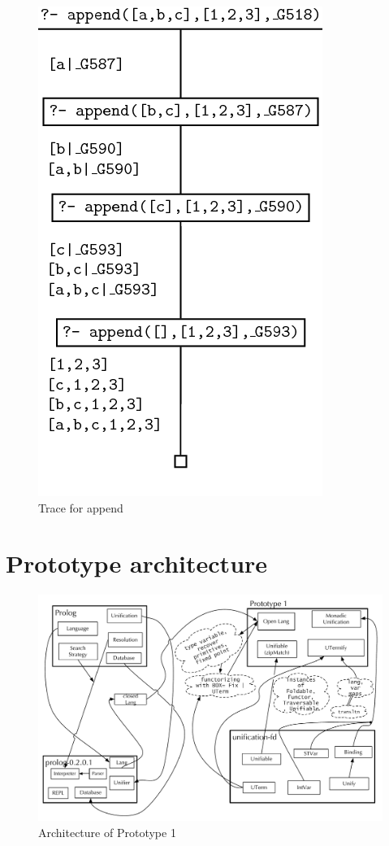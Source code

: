 \documentclass[thesis-solanki.tex]{subfiles}
\begin{document}
\begin{figure}[H]
\centering
\includegraphics[scale = 0.5]{PrologAppendWorking.png}
\caption{Trace for append \cite{webiste:learnprolognowappend}}
\label{fig:Trace for append}
\end{figure}

\section{Prototype architecture}

\begin{figure}[H]
  \includegraphics[width=1\textwidth]{Prototype-1.pdf}
  \caption{Architecture of Prototype 1}
  \label{fig:proto1-arch}
\end{figure}
\end{document}
